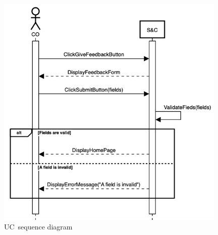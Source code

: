 \begin{figure}[h]
    \centering
    \includegraphics[width=11cm]{images/sequence-diagrams/company-fills-out-feedback-form.png}
    \caption{UC\theuc\ sequence diagram}
\end{figure}


